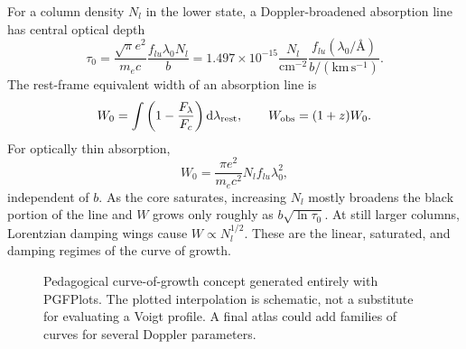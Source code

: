 For a column density $N_l$ in the lower state, a Doppler-broadened absorption line
has central optical depth
\begin{equation}
 \tau_0=\frac{\sqrt{\pi}e^2}{m_ec}
         \frac{f_{lu}\lambda_0N_l}{b}
 =1.497\times10^{-15}
 \frac{N_l}{\mathrm{cm}^{-2}}
 \frac{f_{lu}(\lambda_0/\text{\AA})}{b/(\mathrm{km\,s^{-1}})}.
 \label{eq:line-center-optical-depth}
\end{equation}
The rest-frame equivalent width of an absorption line is
\begin{equation}
 W_0=\int\left(1-\frac{F_\lambda}{F_c}\right)
      \mathrm{d}\lambda_{\rm rest},
 \qquad W_{\rm obs}=(1+z)W_0.
 \label{eq:equivalent-width}
\end{equation}
For optically thin absorption,
\begin{equation}
 W_0=\frac{\pi e^2}{m_ec^2}N_lf_{lu}\lambda_0^2,
 \label{eq:linear-cog}
\end{equation}
independent of $b$.  As the core saturates, increasing $N_l$ mostly broadens the
black portion of the line and $W$ grows only roughly as $b\sqrt{\ln \tau_0}$.
At still larger columns, Lorentzian damping wings cause
$W\propto N_l^{1/2}$.  These are the linear, saturated, and damping regimes of the
curve of growth.

\begin{figure}[tbp]
\centering
{}
\caption{Pedagogical curve-of-growth concept generated entirely with PGFPlots.
The plotted interpolation is schematic, not a substitute for evaluating a Voigt
profile.  A final atlas could add families of curves for several Doppler parameters.}
\label{fig:curve-of-growth-concept}
\end{figure}

